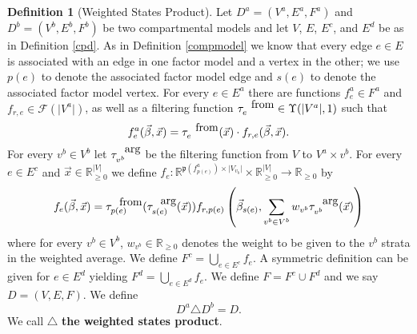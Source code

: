 \documentclass[pdflatex,sn-basic]{sn-jnl}%
\theoremstyle{definition}
\newtheorem{definition}{Definition}
\newcommand{\R}{\mathbb{R}}%
\newcommand{\Rnn}{\mathbb{R}_{\ge 0}}%
\newcommand{\abs}[1]{\lvert #1 \rvert}%
\newcommand{\pardim}[1]{\mathfrak{p}(#1)}%
\newcommand{\betavec}{\vec{\beta}}
\newcommand{\xvec}{\vec{x}}
\newcommand{\fr}{\ensuremath{\mathcal F}}
\newcommand{\tauf}{\tau^{\mbox{\tiny from}}}
\newcommand{\taua}{\tau^{\mbox{\tiny arg}}}
\begin{document}
\begin{definition}[Weighted States Product]
    Let $D^a = (V^a, E^a, F^a)$ and $D^b = (V^b, E^b, F^b)$ be two compartmental models and let $V$, $E$, $E^c$, and $E^d$ be as in Definition \ref{cpd}. As in Definition \ref{compmodel} we know that every edge $e\in E$ is associated with an edge in one factor model and a vertex in the other; we use $p(e)$ to denote the associated factor model edge and $s(e)$ to denote the associated factor model vertex. For every $e\in E^a$ there are functions $f^a_{e}\in F^a$ and $f_{r,e}\in \fr(\abs{V^a})$, as well as a filtering function $\tauf_{e}\in\Upsilon(\abs{V^a}, 1)$ such that
    \begin{equation}
        f^a_{e}(\betavec, \xvec) = \tauf_e(\xvec)\cdot f_{r,e}(\betavec, \xvec).
    \end{equation}
        For every $v^b\in V^b$ let $\taua_{v^b}$ be the filtering function from $V$ to $V^a\times v^b$. For every $e\in E^c$ and $\vec{x}\in\Rnn^{\abs{V}}$ we define $f_e:\R^{\pardim{f^a_{p(e)}}\times \abs{V_{v_b}}}\times\Rnn^{\abs{V}}\rightarrow\Rnn$ by
     \begin{equation}
        f_e(\vec{\beta}, \vec{x}) = \tauf_{p(e)}(\taua_{s(e)}(\xvec)) f_{r,p(e)}\left(\betavec_{s(e)},\sum\limits_{v^b\in V^b} w_{v^b}\taua_{v^b}(\xvec)\right)
     \end{equation}
     where for every $v^b\in V^b$, $w_{v^b}\in\Rnn$ denotes the weight to be given to the $v^b$ strata in the weighted average. We define $F^{c} = \bigcup\limits_{e\in E^c}f_e$. A symmetric definition can be given for $e\in E^d$ yielding $F^{d} = \bigcup\limits_{e\in E^d}f_e$. We define $F = F^{c}\cup F^{d}$ and we say $D=(V, E, F)$. We define
    \begin{equation}
        D^a\triangle D^b = D.
    \end{equation} We call $\triangle$ \textbf{the weighted states product}.
\end{definition}
\end{document}
